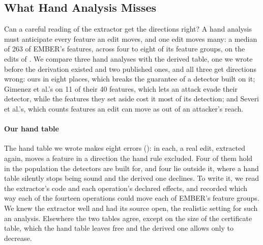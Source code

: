 \subsection{What Hand Analysis Misses}
\label{sec:eval:hand}

Can a careful reading of the extractor get the directions right? A hand analysis must anticipate every feature an
edit moves, and one edit moves many: a median of 263 of EMBER's features, across four to eight of its feature groups,
on the edits of . We compare three hand analyses with the derived table, one we wrote before the
derivation existed and two published ones, and all three get directions wrong: ours in eight places, which breaks the
guarantee of a detector built on it; Gimenez et al.'s on 11 of their 40 features, which lets an attack evade their
detector, while the features they set aside cost it most of its detection; and Severi et al.'s, which counts features
an edit can move as out of an attacker's reach.

\paragraph{Our hand table}
The hand table we wrote makes eight errors (): in each, a real edit, extracted again, moves a
feature in a direction the hand rule excluded. Four of them hold in the population the detectors are built for, and
four lie outside it, where a hand table silently stops being sound and the derived one declines. To write it, we read
the extractor's code and each operation's declared effects, and recorded which way each of the fourteen
operations could move each of EMBER's feature groups. We knew the extractor well and had its source open,
the realistic setting for such an analysis. Elsewhere the two tables agree, except on the size of the certificate
table, which the hand table leaves free and the derived one allows only to decrease.


